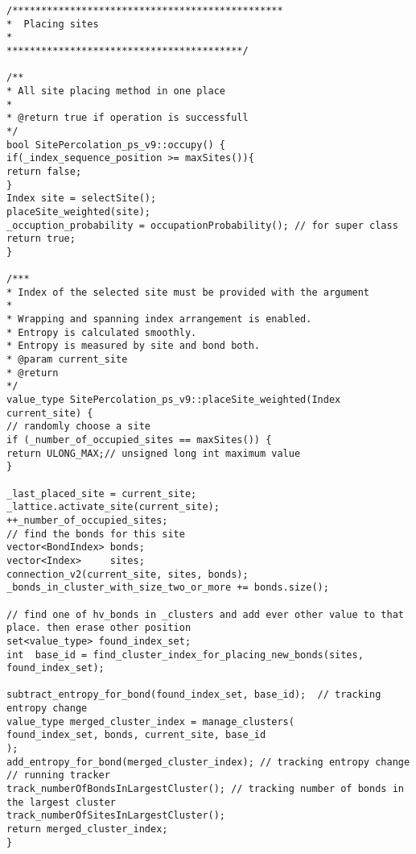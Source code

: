 \begin{lstlisting}[style=CStyle]
/***********************************************
*  Placing sites
*
*****************************************/

/**
* All site placing method in one place
*
* @return true if operation is successfull
*/
bool SitePercolation_ps_v9::occupy() {
if(_index_sequence_position >= maxSites()){
return false;
}
Index site = selectSite();
placeSite_weighted(site);
_occuption_probability = occupationProbability(); // for super class
return true;
}

/***
* Index of the selected site must be provided with the argument
*
* Wrapping and spanning index arrangement is enabled.
* Entropy is calculated smoothly.
* Entropy is measured by site and bond both.
* @param current_site
* @return
*/
value_type SitePercolation_ps_v9::placeSite_weighted(Index current_site) {
// randomly choose a site
if (_number_of_occupied_sites == maxSites()) {
return ULONG_MAX;// unsigned long int maximum value
}

_last_placed_site = current_site;
_lattice.activate_site(current_site);
++_number_of_occupied_sites;
// find the bonds for this site
vector<BondIndex> bonds;
vector<Index>     sites;
connection_v2(current_site, sites, bonds);
_bonds_in_cluster_with_size_two_or_more += bonds.size();

// find one of hv_bonds in _clusters and add ever other value to that place. then erase other position
set<value_type> found_index_set;
int  base_id = find_cluster_index_for_placing_new_bonds(sites, found_index_set);

subtract_entropy_for_bond(found_index_set, base_id);  // tracking entropy change
value_type merged_cluster_index = manage_clusters(
found_index_set, bonds, current_site, base_id
);
add_entropy_for_bond(merged_cluster_index); // tracking entropy change
// running tracker
track_numberOfBondsInLargestCluster(); // tracking number of bonds in the largest cluster
track_numberOfSitesInLargestCluster();
return merged_cluster_index;
}


\end{lstlisting}
